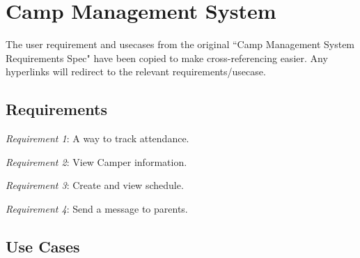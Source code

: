 \documentclass[11pt]{article}
\begin{document}
\clearpage



\appendix
\section{Camp Management System}\label{appendix:camp_sys}
The user requirement and usecases from the original ``Camp Management System Requirements Spec" have been copied to make cross-referencing easier. Any hyperlinks will redirect to the relevant requirements/usecase.

\subsection{Requirements}

\noindent\textit{\hypertarget{Req1}{Requirement 1}}: A way to track attendance.\vspace{0.5em}

\noindent\textit{\hypertarget{Req2}{Requirement 2}}: View Camper information.\vspace{0.5em}

\noindent\textit{\hypertarget{Req3}{Requirement 3}}: Create and view schedule.\vspace{0.5em}

\noindent\textit{\hypertarget{Req4}{Requirement 4}}: Send a message to parents.\vspace{0.5em}

\subsection{Use Cases}
\end{document}
